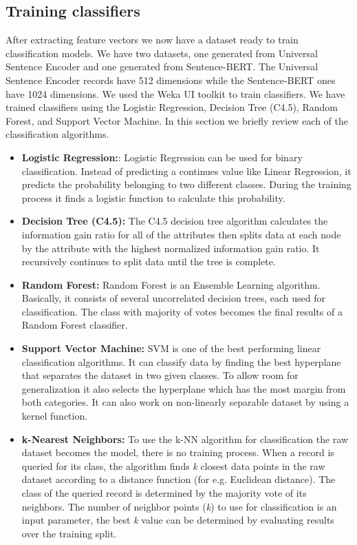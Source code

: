 \documentclass[conference]{IEEEtran}
\begin{document}
\subsection{Training classifiers}
After extracting feature vectors we now have a dataset ready to train classification models. We have two datasets,
one generated from Universal Sentence Encoder and one generated from Sentence-BERT. The Universal Sentence Encoder
records have 512 dimensions while the Sentence-BERT ones have 1024 dimensions. We used the Weka UI toolkit
to train classifiers. We have trained classifiers using the Logistic Regression, Decision Tree (C4.5), 
Random Forest, and Support Vector Machine. In this section we briefly review each of the 
classification algorithms.
\begin{itemize}
  \item\textbf{Logistic Regression:}: Logistic Regression can be used for binary classification. Instead of 
  predicting a continues value like Linear Regression, it predicts the probability belonging to two different 
  classes. During the training process it finds a logistic function to calculate this probability.
  \item\textbf{Decision Tree (C4.5):} The C4.5 decision tree algorithm calculates the information gain ratio 
  for all of the attributes then splits data at each node by the attribute with the highest normalized 
  information gain ratio. It recursively continues to split data until the tree is complete.
  \item\textbf{Random Forest:} Random Forest is an Ensemble Learning algorithm. Basically, it consists of several 
  uncorrelated decision trees, each used for classification. The class with majority of votes becomes 
  the final results of a Random Forest classifier.
  \item\textbf{Support Vector Machine:} SVM is one of the best performing linear classification algorithms. It can 
  classify data by finding the best hyperplane that separates the dataset in two given classes. To allow 
  room for generalization it also selects the hyperplane which has the most margin from both categories. It can 
  also work on non-linearly separable dataset by using a kernel function.
  \item\textbf{k-Nearest Neighbors:} To use the k-NN algorithm for classification the raw dataset becomes the model,
  there is no training process. When a record is queried for its class, the algorithm finds \textit{k} closest 
  data points in the raw dataset according to a distance function (for e.g. Euclidean distance). The class of 
  the queried record is determined by the majority vote of its neighbors. The number of neighbor 
  points (\textit{k}) to use for classification is an input parameter, the best \textit{k} value can be 
  determined by evaluating results over the training split.
\end{itemize}
\end{document}
